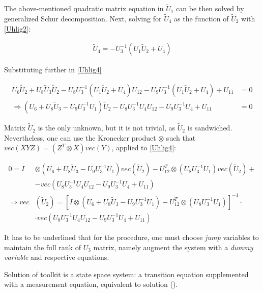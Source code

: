 \documentclass{pracamgr}
\numberwithin{equation}{section}
\begin{document}
The above-mentioned quadratic matrix equation in $\tilde{U}_{1}$ can be then solved by generalized Schur decomposition. Next, solving for $\tilde{U}_{4}$ as the function of $\tilde{U}_{2}$ with \ref{Uhlig2}:

\begin{align}
\tilde{U}_{4} = -U_{3}^{-1} \left(U_{1}\tilde{U}_{2} + U_{4} \right)
\end{align}

Substituting further in \ref{Uhlig4}

\begin{align}
U_{6}\tilde{U}_{2}+U_{8}\tilde{U}_{3}\tilde{U}_{2}-U_{8}U_{3}^{-1} (U_{1}\tilde{U}_{2}+U_{4})U_{12} - U_{9}U_{3}^{-1} (U_{1}\tilde{U}_{2}+U_{4})+U_{11} &= 0 \nonumber \\
\Rightarrow \left(U_{6} + U_{8}\tilde{U}_{3} - U_{9}U_{3}^{-1}U_{1} \right)\tilde{U}_{2} - U_{8}U_{3}^{-1}U_{4}U_{12} - U_{9}U_{3}^{-1}U_{4} + U_{11} &= 0
\end{align}

Matrix $\tilde{U}_{2}$ is the only unknown, but it is not trivial, as $\tilde{U}_{2}$ is sandwiched. Nevertheless, one can use the Kronecker product $\otimes$ such that $vec \left(XYZ\right) = \left(Z^{T} \otimes X \right) vec(Y)$, applied to \ref{Uhlig4}:

\begin{align}
0 = I &\otimes \left(U_{6} + U_{8}\tilde{U}_{3} - U_{9}U_{3}^{-1}U_{1} \right) vec(\tilde{U}_{2}) - U_{12}^{T} \otimes \left(U_{8}U_{3}^{-1}U_{1}\right) vec(\tilde{U}_{2}) + \\
& - vec\left(U_{8}U_{3}^{-1}U_{4}U_{12} - U_{9}U_{3}^{-1}U_{4} + U_{11} \right) \nonumber \\
\Rightarrow vec&(\tilde{U}_{2}) = \left[ I \otimes \left(U_{6} + U_{8}\tilde{U}_{3} - U_{9}U_{3}^{-1}U_{1} \right) - U_{12}^{T} \otimes \left(U_{8}U_{3}^{-1}U_{1} \right)\right]^{-1} \cdot \\
& \cdot vec\left(U_{8}U_{3}^{-1}U_{4}U_{12} - U_{9}U_{3}^{-1}U_{4} + U_{11} \right)
\end{align}

It has to be underlined that for the \citet{uhlig1998toolkit} procedure, one must choose \textit{jump} variables to maintain the full rank of $U_{3}$ matrix, namely augment the system with a \textit{dummy variable} and respective equations.

Solution of \citet{uhlig1998toolkit} toolkit is a state space system: a transition equation supplemented with a measurement equation, equivalent to \citet{klein2000using} solution (\citet{bonaldi2010identification}).
\end{document}
